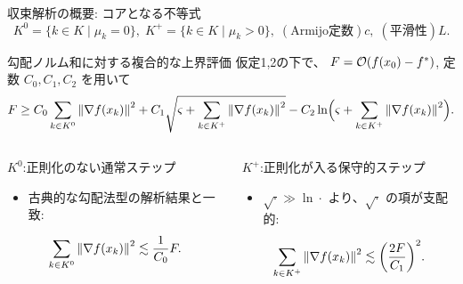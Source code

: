 \documentclass[dvipdfmx,12pt,aspectratio=169]{beamer}
\begin{document}
\begin{frame}{収束解析の概要: コアとなる不等式}
  \vspace{-0.7em}
  \begin{equation*}
    K^0 = \{k \in K \mid \mu_k = 0\}, \; K^+ = \{k \in K \mid \mu_k > 0\}, \; (\text{Armijo定数}) c, \; (\text{平滑性}) L.
  \end{equation*}
  \vspace{-0.7em}
  \begin{block}{勾配ノルム和に対する複合的な上界評価}
    仮定1,2の下で、
    $F = \order{f(x_0)-f^*}$,
    定数 $C_0, C_1, C_2$ を用いて\vspace{-0.5em}
    \begin{equation*}
      F \ge C_0 \sum_{k\in K^0}\norm{\nabla f(x_k)}^2 + C_1 \sqrt{\varsigma+\sum_{k\in K^+}\norm{\nabla f(x_k)}^2} - C_2\ln\Bigl(\varsigma+\sum_{k\in K^+}\norm{\nabla f(x_k)}^2\Bigr).
    \end{equation*}
  \end{block}
  \vspace{-1.2em}
  \begin{columns}[t]
    \begin{exampleblock}{$K^0$:正則化のない通常ステップ}
      \begin{itemize}
        \item 古典的な勾配法型の解析結果と一致:
      \end{itemize}
      \[
        \sum_{k\in K^0}\norm{\nabla f(x_k)}^2
        \lesssim \frac{1}{C_0} F.
      \]
    \end{exampleblock}
    \begin{exampleblock}{$K^+$:正則化が入る保守的ステップ}
      \begin{itemize}
        \item $\sqrt{\cdot} \gg \ln{\cdot}$ より、$\sqrt{\cdot}$ の項が支配的:
      \end{itemize}
      \[
        \sum_{k\in K^+}\norm{\nabla f(x_k)}^2 \lesssim \qty(\frac{2F}{C_1})^2.
      \]
    \end{exampleblock}
  \end{columns}
\end{frame}
\end{document}
